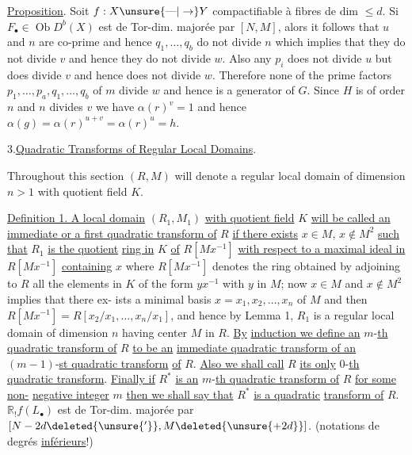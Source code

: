 \uline{Proposition}. Soit $f:X\unsure{\text{---}|\to}Y$ compactifiable à fibres
de dim $\le d$. Si $F_\bullet\in\operatorname{Ob}D^b(X)$ est de
Tor-dim. majorée par $[N,M]$, alors
it follows that $u$ and $n$ are co-prime and hence $q_1,\ldots,q_b$
do not divide $n$ which implies that they do not divide $v$ and
hence they do not divide $w$. Also any $p_i$ does not divide $u$
but does divide $v$ and hence does not divide $w$. Therefore none
of the prime factors $p_1,\ldots,p_a,q_1,\ldots,q_b$ of $m$ divide $w$
and hence  is a generator of $G$. Since $H$ is
of order $n$ and $n$ divides $v$ we have $\alpha(r)^v=1$ and hence
$\alpha(g)=\alpha(r)^{u+v}=\alpha(r)^u=h$.

3.\quad\uline{Quadratic Transforms of Regular Local Domains}.

Throughout this section $(R,M)$ will denote a regular local
domain of dimension $n>1$ with quotient field $K$.

\uline{Definition 1. A local domain} $(R_1,M_1)$ \uline{with quotient field}
$K$ \uline{will be called an immediate or a first quadratic transform of}
$R$ \uline{if there exists} $x\in M$, $x\notin M^2$ \uline{such that} $R_1$ \uline{is the quotient}
\uline{ring in} $K$ \uline{of} $R[Mx^{-1}]$ \uline{with respect to a maximal ideal in}
$R[Mx^{-1}]$ \uline{containing} $x$ where $R[Mx^{-1}]$ denotes the ring obtained
by adjoining to $R$ all the elements in $K$ of the form $yx^{-1}$
with $y$ in $M$; now $x\in M$ and $x\notin M^2$ implies that there ex-
ists a minimal basis $x=x_1,x_2,\ldots,x_n$ of $M$ and then
$R[Mx^{-1}]=R[x_2/x_1,\ldots,x_n/x_1]$, and hence by Lemma 1, $R_1$ is a
regular local domain of dimension $n$ having center $M$ in $R$. \uline{By}
\uline{induction we define an} $m$-\uline{th quadratic transform of} $R$ \uline{to be an}
\uline{immediate quadratic transform of an} $(m-1)$-\uline{st quadratic transform}
\uline{of} $R$. \uline{Also we shall call} $R$ \uline{its only} $0$-\uline{th quadratic transform}.
\uline{Finally if} $R^*$ \uline{is an} $m$-\uline{th quadratic transform of} $R$ \uline{for some non-}
\uline{negative integer} $m$ \uline{then we shall say that} $R^*$ \uline{is a quadratic}
\uline{transform of} $R$.
$\mathbb R_!f(L_\bullet)$ est de Tor-dim. majorée par
$[N-2d\deleted{\unsure{'}},M\deleted{\unsure{+2d}}]$. (notations  de degrés \uline{inférieurs}!)

